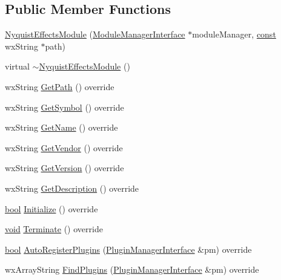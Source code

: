\subsection*{Public Member Functions}
\begin{DoxyCompactItemize}
\item 
\hyperlink{class_nyquist_effects_module_ab3e50d4cd373002f3dc6419c8450f1bd}{Nyquist\+Effects\+Module} (\hyperlink{class_module_manager_interface}{Module\+Manager\+Interface} $\ast$module\+Manager, \hyperlink{getopt1_8c_a2c212835823e3c54a8ab6d95c652660e}{const} wx\+String $\ast$path)
\item 
virtual \hyperlink{class_nyquist_effects_module_a8947d6e9f3bc9d239f048c476957ce83}{$\sim$\+Nyquist\+Effects\+Module} ()
\item 
wx\+String \hyperlink{class_nyquist_effects_module_a36aeb23455a6989f2be8060b76918178}{Get\+Path} () override
\item 
wx\+String \hyperlink{class_nyquist_effects_module_a1c9a546b27e6859d19718e5b63ca1730}{Get\+Symbol} () override
\item 
wx\+String \hyperlink{class_nyquist_effects_module_a5de8d25b09bbd1a6ae8c2847e62cb513}{Get\+Name} () override
\item 
wx\+String \hyperlink{class_nyquist_effects_module_a039b60d25978b8ac3eb2ce38468b794f}{Get\+Vendor} () override
\item 
wx\+String \hyperlink{class_nyquist_effects_module_a87a0ea8bb78163db15749ca7c7f039e6}{Get\+Version} () override
\item 
wx\+String \hyperlink{class_nyquist_effects_module_a8ccc0fa2ea4b2547d97c32bbd8198bdf}{Get\+Description} () override
\item 
\hyperlink{mac_2config_2i386_2lib-src_2libsoxr_2soxr-config_8h_abb452686968e48b67397da5f97445f5b}{bool} \hyperlink{class_nyquist_effects_module_afcc499967b28badfea0aeecc0bbc2ab5}{Initialize} () override
\item 
\hyperlink{sound_8c_ae35f5844602719cf66324f4de2a658b3}{void} \hyperlink{class_nyquist_effects_module_a04169433789fe0d4654c98296e5529e0}{Terminate} () override
\item 
\hyperlink{mac_2config_2i386_2lib-src_2libsoxr_2soxr-config_8h_abb452686968e48b67397da5f97445f5b}{bool} \hyperlink{class_nyquist_effects_module_a1c1084fa1e5d5784a196041f57a41f74}{Auto\+Register\+Plugins} (\hyperlink{class_plugin_manager_interface}{Plugin\+Manager\+Interface} \&pm) override
\item 
wx\+Array\+String \hyperlink{class_nyquist_effects_module_aa1595a217f8d34b22681a29c7a29617a}{Find\+Plugins} (\hyperlink{class_plugin_manager_interface}{Plugin\+Manager\+Interface} \&pm) override

\end{DoxyCompactItemize}
